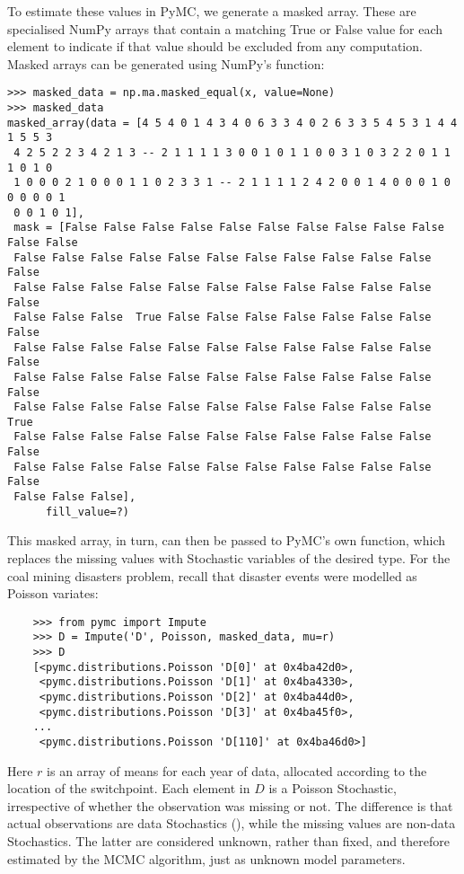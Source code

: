 To estimate these values in PyMC, we generate a masked array. These are specialised NumPy arrays that contain a matching True or False value for each element to indicate if that value should be excluded from any computation. Masked arrays can be generated using NumPy's  function:
\begin{verbatim}
>>> masked_data = np.ma.masked_equal(x, value=None)
>>> masked_data
masked_array(data = [4 5 4 0 1 4 3 4 0 6 3 3 4 0 2 6 3 3 5 4 5 3 1 4 4 1 5 5 3
 4 2 5 2 2 3 4 2 1 3 -- 2 1 1 1 1 3 0 0 1 0 1 1 0 0 3 1 0 3 2 2 0 1 1 1 0 1 0
 1 0 0 0 2 1 0 0 0 1 1 0 2 3 3 1 -- 2 1 1 1 1 2 4 2 0 0 1 4 0 0 0 1 0 0 0 0 0 1
 0 0 1 0 1],
 mask = [False False False False False False False False False False False False
 False False False False False False False False False False False False
 False False False False False False False False False False False False
 False False False  True False False False False False False False False
 False False False False False False False False False False False False
 False False False False False False False False False False False False
 False False False False False False False False False False False  True
 False False False False False False False False False False False False
 False False False False False False False False False False False False
 False False False],
      fill_value=?)

\end{verbatim}

This masked array, in turn, can then be passed to PyMC's own  function, which replaces the missing values with Stochastic variables of the desired type. For the coal mining disasters problem, recall that disaster events were modelled as Poisson variates:

\begin{verbatim}
	>>> from pymc import Impute
	>>> D = Impute('D', Poisson, masked_data, mu=r)
	>>> D
	[<pymc.distributions.Poisson 'D[0]' at 0x4ba42d0>,
	 <pymc.distributions.Poisson 'D[1]' at 0x4ba4330>,
	 <pymc.distributions.Poisson 'D[2]' at 0x4ba44d0>,
	 <pymc.distributions.Poisson 'D[3]' at 0x4ba45f0>,
	...
	 <pymc.distributions.Poisson 'D[110]' at 0x4ba46d0>]
\end{verbatim}

Here $r$ is an array of means for each year of data, allocated according to the location of the switchpoint. Each element in $D$ is a Poisson Stochastic, irrespective of whether the observation was missing or not. The difference is that actual observations are data Stochastics (), while the missing values are non-data Stochastics. The latter are considered unknown, rather than fixed, and therefore estimated by the MCMC algorithm, just as unknown model parameters.

